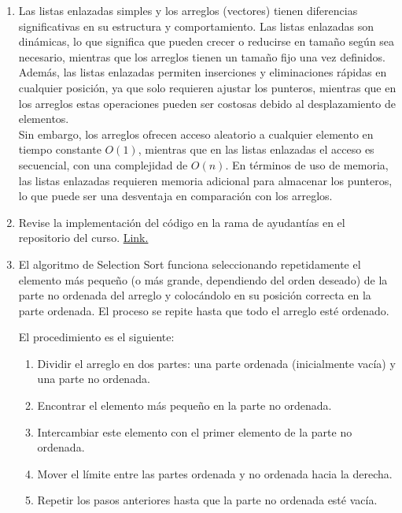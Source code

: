 \documentclass[12pt]{article}
\begin{document}
\begin{enumerate}
            \item Las listas enlazadas simples y los arreglos (vectores) tienen diferencias significativas en su estructura y comportamiento. Las listas enlazadas son dinámicas, lo que significa que pueden crecer o reducirse en tamaño según sea necesario, mientras que los arreglos tienen un tamaño fijo una vez definidos.\\
            Además, las listas enlazadas permiten inserciones y eliminaciones rápidas en cualquier posición, ya que solo requieren ajustar los punteros, mientras que en los arreglos estas operaciones pueden ser costosas debido al desplazamiento de elementos.\\
            Sin embargo, los arreglos ofrecen acceso aleatorio a cualquier elemento en tiempo constante \(O(1)\), mientras que en las listas enlazadas el acceso es secuencial, con una complejidad de \(O(n)\). En términos de uso de memoria, las listas enlazadas requieren memoria adicional para almacenar los punteros, lo que puede ser una desventaja en comparación con los arreglos.
            
            \item Revise la implementación del código en la rama de ayudantías en el repositorio del curso. \href{https://github.com/otrab/EDA/tree/ayudant%C3%ADas}{Link.}
            
            \item El algoritmo de Selection Sort funciona seleccionando repetidamente el elemento más pequeño (o más grande, dependiendo del orden deseado) de la parte no ordenada del arreglo y colocándolo en su posición correcta en la parte ordenada. El proceso se repite hasta que todo el arreglo esté ordenado.

            El procedimiento es el siguiente:
            \begin{enumerate}
                \item Dividir el arreglo en dos partes: una parte ordenada (inicialmente vacía) y una parte no ordenada.
                \item Encontrar el elemento más pequeño en la parte no ordenada.
                \item Intercambiar este elemento con el primer elemento de la parte no ordenada.
                \item Mover el límite entre las partes ordenada y no ordenada hacia la derecha.
                \item Repetir los pasos anteriores hasta que la parte no ordenada esté vacía.
            \end{enumerate}


\end{enumerate}
\end{document}
